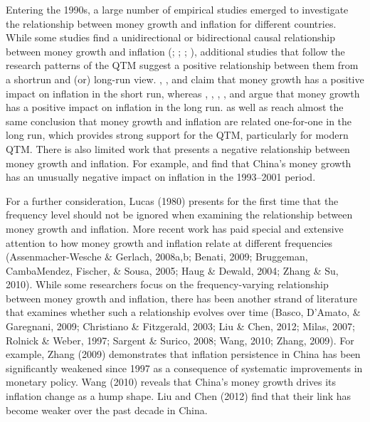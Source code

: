 \documentclass[a4paper,fleqn]{cas-sc}
\begin{document}
Entering the 1990s, a large number of empirical studies emerged to investigate the relationship between money growth and inflation for different countries. While some studies find a unidirectional or bidirectional causal relationship between money growth and inflation (\citealp*{ASSENMACHER2008}; \citealp*{HALL2009}; \citealp*{hossain2005}; \citealp*{liu2002}), additional studies that follow the research patterns of the QTM suggest a positive relationship between them from a shortrun and (or) long-run view. \cite{xie2004}, \cite{roffia2007}, \cite*{Zhang2012} and \cite*{Yu2012} claim that money growth has a positive impact on inflation in the short run, whereas \cite*{mccandless}, \cite{crowder1998}, \cite{christensen}, \cite{Grauwe2005}, and \cite{Zhang2008,zhang2009,Zhang2012,Yu2012} argue that money growth has a positive impact on inflation in the long run. \cite*{MacCandless1995} as well as \cite{Grauwe2005} reach almost the same conclusion that money growth and inflation are related one-for-one in the long run, which provides strong support for the QTM, particularly for modern QTM. There is also limited work that presents a negative relationship between money growth and inflation. For example, \cite{shuai2002} and \cite{wu2002} find that China's money growth has an unusually negative impact on inflation in the 1993–2001 period. 

For a further consideration, Lucas (1980) presents for the first time that the frequency level should not be ignored when examining the relationship between money growth and inflation. More recent work has paid special and extensive attention to how money growth and inflation relate at different frequencies (Assenmacher-Wesche \& Gerlach, 2008a,b; Benati, 2009; Bruggeman, CambaMendez, Fischer, \& Sousa, 2005; Haug \& Dewald, 2004; Zhang \& Su, 2010). While some researchers focus on the frequency-varying relationship between money growth and inflation, there has been another strand of literature that examines whether such a relationship evolves over time (Basco, D'Amato, \& Garegnani, 2009; Christiano \& Fitzgerald, 2003; Liu \& Chen, 2012; Milas, 2007; Rolnick \& Weber, 1997; Sargent \& Surico, 2008; Wang, 2010; Zhang, 2009). For example, Zhang (2009) demonstrates that inflation persistence in China has been significantly weakened since 1997 as a consequence of systematic improvements in monetary policy. Wang (2010) reveals that China's money growth drives its inflation change as a hump shape. Liu and Chen (2012) find that their link has become weaker over the past decade in China.
\end{document}
